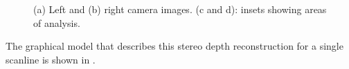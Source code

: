 \begin{figure}[t]
\centerline{
}
\centerline{
}
\caption{(a) Left and (b) right camera images. (c and d): insets showing areas of analysis.}
\label{fig:canoe1}
\end{figure}

The graphical model that describes this stereo depth reconstruction for a single scanline is shown in \fig{\ref{fig:canoe3}}.  



